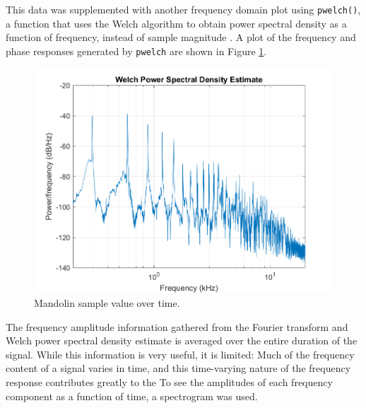 \documentclass{article}
\begin{document}
            This data was supplemented with another frequency domain plot using \texttt{pwelch()}, a function that uses the Welch algorithm to obtain power spectral density as a function of frequency, instead of sample magnitude \cite{solomon1991psd}.
            A plot of the frequency and phase responses generated by \texttt{pwelch} are shown in Figure \ref{welchMando}.
            \begin{figure}[h]
                \includegraphics[scale=0.5]{images/welchMando.png}%
                \centering
                \caption{Mandolin sample value over time.}
                \label{welchMando}
            \end{figure}
            The frequency amplitude information gathered from the Fourier transform and Welch power spectral density estimate is averaged over the entire duration of the signal.
            While this information is very useful, it is limited: Much of the frequency content of a signal varies in time, and this time-varying nature of the frequency response contributes greatly to the 
            To see the amplitudes of each frequency component as a function of time, a spectrogram was used.
\end{document}
